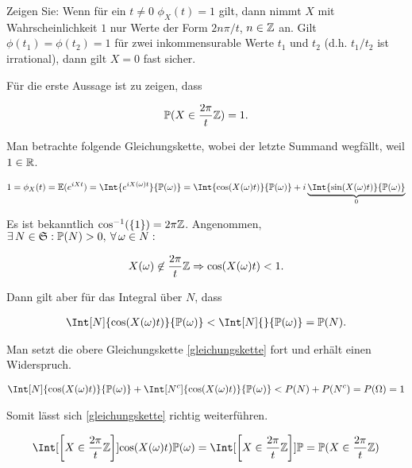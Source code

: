 \begin{exercise}

Zeigen Sie: Wenn für ein $t \neq 0$ $\phi_X(t) = 1$ gilt, dann nimmt $X$ mit Wahrscheinlichkeit $1$ nur Werte der Form $2n \pi/t$, $n \in \mathbb{Z}$ an. Gilt $\phi(t_1) = \phi(t_2) = 1$ für zwei inkommensurable Werte $t_1$ und $t_2$ (d.h. $t_1/t_2$ ist irrational), dann gilt $X = 0$ fast sicher.

\end{exercise}

\begin{solution}

Für die erste Aussage ist zu zeigen, dass

\begin{align*}
  \mathbb{P}(X \in \frac{2 \pi}{t} \mathbb{Z}) = 1.
\end{align*}

Man betrachte folgende Gleichungskette, wobei der letzte Summand wegfällt, weil $1 \in \mathbb{R}$.

\begin{align}
  1
  = \phi_X(t)
  = \E(e^{iXt})
  = \Int{e^{iX(\omega)t}}{\P(\omega)}
  = \Int{\cos(X(\omega)t)}{\P(\omega)} +
    i \underbrace{\Int{\sin(X(\omega)t)}{\P(\omega)}}_0
  \label{gleichungskette}
\end{align}

Es ist bekanntlich $\cos^{-1}(\left \{ 1 \right \}) = 2 \pi \mathbb{Z}$. Angenommen, $\exists \, N \in \mathfrak{S}: \mathbb{P}(N) > 0, \: \forall \, \omega \in N:$

\begin{align*}
  X(\omega) \not \in \frac{2 \pi}{t} \mathbb{Z}
  \Rightarrow
  \cos(X(\omega)t) < 1.
\end{align*}

Dann gilt aber für das Integral über $N$, dass

\begin{align*}
  \Int[N]{\cos(X(\omega)t)}{\P(\omega)} <
  \Int[N]{}{\P(\omega)} =
  \P(N).
\end{align*}

Man setzt die obere Gleichungskette \eqref{gleichungskette} fort und erhält einen Widerspruch.

\begin{align*}
  \Int[N]{\cos(X(\omega)t)}{\P(\omega)} +
  \Int[N^c]{\cos(X(\omega)t)}{\P(\omega)} <
  P(N) + P(N^c) = P(\Omega) = 1
\end{align*}

Somit lässt sich \eqref{gleichungskette} richtig weiterführen.

\begin{align*}
  \Int[\bbraces{X \in \frac{2 \pi}{t} \Z}]{\cos(X(\omega)t)}{\P(\omega)}
  = \Int[\bbraces{X \in \frac{2 \pi}{t} \Z}]{}{\P}
  = \P(X \in \frac{2 \pi}{t} \Z)
\end{align*}


\end{solution}
